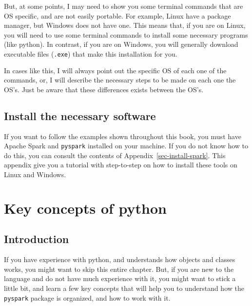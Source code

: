 \documentclass[
  11pt,
  letterpaper,
  DIV=11,
  numbers=noendperiod]{scrreprt}
\begin{document}
But, at some points, I may need to show you some terminal commands that
are OS specific, and are not easily portable. For example, Linux have a
package manager, but Windows does not have one. This means that, if you
are on Linux, you will need to use some terminal commands to install
some necessary programs (like python). In contrast, if you are on
Windows, you will generally download executable files (\texttt{.exe})
that make this installation for you.

In cases like this, I will always point out the specific OS of each one
of the commands, or, I will describe the necessary steps to be made on
each one the OS's. Just be aware that these differences exists between
the OS's.

\hypertarget{install-the-necessary-software}{%
\section*{Install the necessary
software}\label{install-the-necessary-software}}


If you want to follow the examples shown throughout this book, you must
have Apache Spark and \texttt{pyspark} installed on your machine. If you
do not know how to do this, you can consult the contents of
Appendix~\ref{sec-install-spark}. This appendix give you a tutorial with
step-to-step on how to install these tools on Linux and Windows.


\hypertarget{key-concepts-of-python}{%
\chapter{Key concepts of python}\label{key-concepts-of-python}}

\hypertarget{introduction-1}{%
\section{Introduction}\label{introduction-1}}

If you have experience with python, and understands how objects and
classes works, you might want to skip this entire chapter. But, if you
are new to the language and do not have much experience with it, you
might want to stick a little bit, and learn a few key concepts that will
help you to understand how the \texttt{pyspark} package is organized,
and how to work with it.
\end{document}
